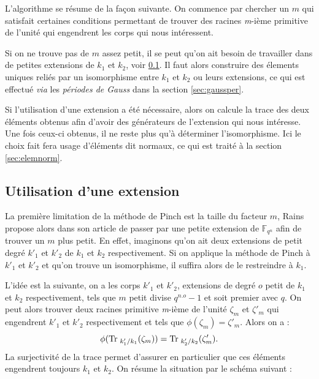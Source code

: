 \documentclass[a4paper]{article} %
\numberwithin{section}{part}
\numberwithin{equation}{section}
\newcommand\nroot[1]{\textit{#1}-ième}
\newcommand\GF[1]{\mathbb{F}_{#1}}
\begin{document}
L'algorithme se résume de la façon suivante. On commence par chercher un $m$ qui
satisfait certaines conditions permettant de trouver des racines \nroot{m}
primitive de l'unité qui engendrent les corps qui nous intéressent.\par
Si on ne trouve pas de $m$ assez petit, il se peut qu'on ait besoin de
travailler dans de petites extensions de $k_1$ et $k_2$, voir
\ref{sec:extension}. Il faut alors construire des élements uniques 
reliés par un isomorphisme entre $k_1$ et $k_2$ ou leurs extensions, ce qui est
effectué \textit{via} les \emph{périodes de Gauss} dans la section 
\ref{sec:gaussper}.\par
Si l'utilisation d'une extension a été nécessaire, alors on calcule la trace des
deux éléments obtenus afin d'avoir des générateurs de l'extension qui nous
intéresse. Une fois ceux-ci obtenus, il ne reste plus qu'à déterminer
l'isomorphisme. Ici le choix fait fera usage d'éléments dit normaux, ce qui est
traité à la section \ref{sec:elemnorm}.

\subsection{Utilisation d'une extension}
\label{sec:extension}
La première limitation de la méthode de Pinch est la taille du facteur
$m$, Rains propose alors dans son article \cite{Rai} de passer par une petite
extension de $\GF{q^n}$ afin de trouver un $m$ plus petit. En effet, imaginons 
qu'on ait deux extensions de petit degré $k'_1$ et $k'_2$ de $k_1$ et $k_2$ 
respectivement. Si on applique la méthode de Pinch à $k'_1$ et $k'_2$ et 
qu'on trouve un isomorphisme, il suffira alors de le restreindre à $k_1$.\par
L'idée est la suivante, on a les corps $k'_1$ et $k'_2$, extensions de degré $o$
petit de $k_1$ et $k_2$ respectivement, tels que $m$ petit divise $q^{n.o} -
1$ et soit premier avec $q$. On peut alors trouver deux racines primitive
\nroot{m} de l'unité $\zeta_{m}$ et $\zeta'_m$ qui engendrent $k'_1$ et $k'_2$
respectivement et tels que $\phi(\zeta_m) = \zeta'_m$. Alors on a : 
\begin{equation}
\phi(\textup{Tr\;}_{k'_1/k_1}(\zeta_{m})) =
\textup{Tr\;}_{k'_2/k_2}(\zeta'_{m}).
\end{equation}
La surjectivité de la trace permet d'assurer en particulier que ces
éléments engendrent toujours $k_1$ et $k_2$. On résume la situation par le 
schéma suivant :
\end{document}
